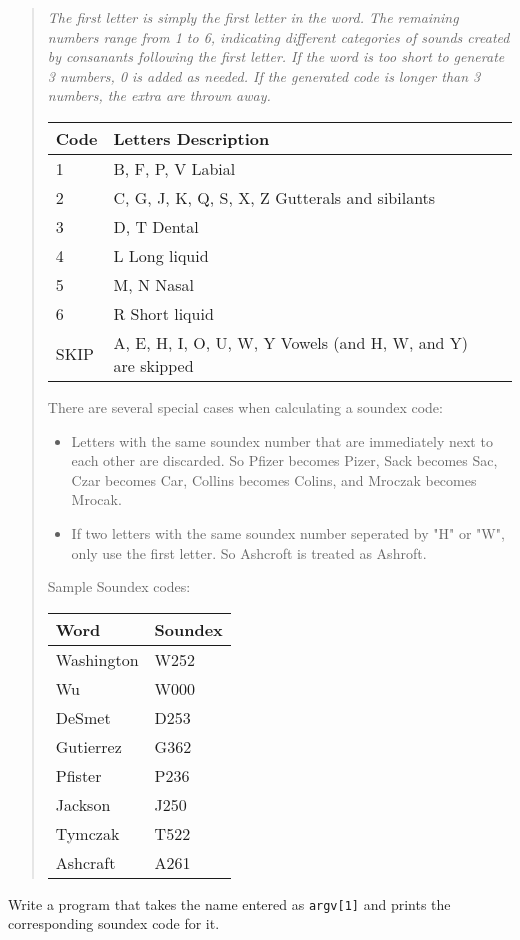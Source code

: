 \begin{quote}
{\it 
The first letter is simply the first letter in the word. The remaining numbers range from 1 to 6, indicating different categories of sounds created by consanants following the first letter. If the word is too short to generate 3 numbers, 0 is added as needed. If the generated code is longer than 3 numbers, the extra are thrown away.

\begin{center}
\begin{tabular}{|l|l|l|}\hline
Code& 	Letters	Description \\ \hline
1	& B, F, P, V	Labial \\ \hline
2	& C, G, J, K, Q, S, X, Z	Gutterals and sibilants \\ \hline
3	& D, T	Dental \\ \hline
4	& L	Long liquid \\ \hline
5	& M, N	Nasal \\ \hline
6	& R	Short liquid \\ \hline
SKIP	& A, E, H, I, O, U, W, Y	Vowels (and H, W, and Y) are skipped \\ \hline
\end{tabular}
\end{center}

There are several special cases when calculating a soundex code:

\begin{itemize}
\item Letters with the same soundex number that are immediately next to each other are discarded. So Pfizer becomes Pizer, Sack becomes Sac, Czar becomes Car, Collins becomes Colins, and Mroczak becomes Mrocak.
\item If two letters with the same soundex number seperated by "H" or "W", only use the first letter. So Ashcroft is treated as Ashroft.
\end{itemize}

Sample Soundex codes:

\begin{center}
\begin{tabular}{|l|l|} \hline
Word	 	& Soundex \\ \hline
Washington	& W252 \\ \hline
Wu	 	& W000 \\ \hline
DeSmet	 	& D253 \\ \hline
Gutierrez	& G362 \\ \hline
Pfister	 	& P236 \\ \hline
Jackson	 	& J250 \\ \hline
Tymczak	 	& T522 \\ \hline
Ashcraft	& A261 \\ \hline
\end{tabular}
\end{center}
}
\end{quote}

\begin{exercise}
Write a program that takes the name entered as \verb^argv[1]^
and prints the corresponding soundex code for it.
\end{exercise}
